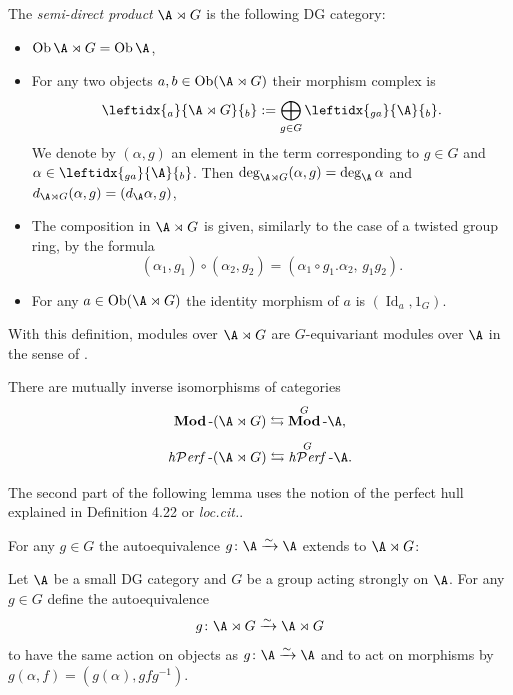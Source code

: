 \documentclass[12pt,a4paper,reqno]{amsart}
\DeclareMathOperator{\obj}{Ob}
\DeclareMathOperator{\modd}{\bf Mod}
\DeclareMathOperator{\id}{Id}
\DeclareMathOperator{\hperf}{{\it h\mathcal{P}erf}}
\begin{document}
\begin{defn}
	\label{defn-equivariant-dg-category}
	The \emph{semi-direct product} $\A \rtimes G$ is the following
	DG category:
	\begin{itemize}
		\item $\obj \A \rtimes G = \obj \A$,
		\item For any two objects $a,b \in \obj(\A \rtimes G)$ their morphism complex is 
		\begin{equation*}
	\leftidx{_{a}}{{\A \rtimes G}}{_b} := 	\bigoplus_{g \in G}  \leftidx{_{ga}}{{\A}}{_b}.
		\end{equation*}
	We denote by $(\alpha, g)$ an element in the term corresponding to $g \in  G$ and $\alpha \in \leftidx{_{ga}}{{\A}}{_b}$. Then
		$\deg_{\A \rtimes G} (\alpha,g) = \deg_{\A} \alpha$ and 
		$d_{\A \rtimes G}(\alpha,g) = (d_\A \alpha,g)$,
		\item The composition in $\A \rtimes G$ is given, similarly to the case of a twisted group ring, by  the formula
		\begin{equation*}
			(\alpha_1, g_1) \circ (\alpha_2, g_2) =
			(\alpha_1 \circ g_1.\alpha_2,\, g_1 g_2). 
		\end{equation*}
		\item For any $a \in \obj (\A \rtimes G)$ the identity morphism 
		of $a$ is $(\id_a, 1_G)$. 
	\end{itemize}
\end{defn}
With this definition, modules over $\A \rtimes G$ 
are $G$-equivariant modules over $\A$ in the sense of 
\cite[\S2.1.3]{GanterKapranov-SymmetricAndExteriorPowersOfCategories}. 
\begin{lemma}
	\label{lemma-A-rtimes-G-modules-are-G-equiv-A-modules}
	There are mutually inverse isomorphisms of categories
	\[ \modd\text{-}(\A \rtimes G) \leftrightarrows \modd^G\text{-}\A, \]
	\[ \hperf\text{-}(\A \rtimes G) \leftrightarrows \hperf^G\text{-}\A.\]
\end{lemma}
The 
second part of the following lemma uses the notion of the perfect hull
explained in Definition 4.22 or \textit{loc.cit.}.

\bigskip
\noindent
For any $g \in G$ the autoequivalence $g\colon \A \xrightarrow{\sim} \A$ 
extends to $\A \rtimes G$:
\begin{defn}
	\label{defn-group-element-as-autoequivalence-of-the-equivariant-category}
	Let $\A$ be a small DG category and $G$ be a group acting strongly on
	$\A$. For any $g \in G$ define the autoequivalence 
	$$ g\colon \A \rtimes G \xrightarrow{\sim} \A \rtimes G $$
	to have the same action on objects as
	$g\colon \A \xrightarrow{\sim} \A$ and to act on morphisms 
	by $g(\alpha, f) = (g(\alpha), gfg^{-1})$. 
\end{defn}
\end{document}
